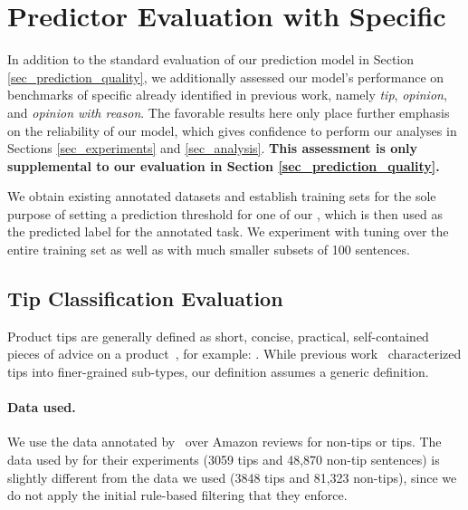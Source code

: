 % 




\section{Predictor Evaluation with Specific \taxtypes{}}
\label{sec_appendix_predictor_eval_type_specific}

In addition to the standard evaluation of our \taxtypes{} prediction model in Section \ref{sec_prediction_quality}, we additionally assessed our model's performance on benchmarks of specific \taxtypes{} already identified in previous work, namely \textit{tip}, \textit{opinion}, and \textit{opinion with reason}. The favorable results here only place further emphasis on the reliability of our model, which gives confidence to perform our analyses in Sections \ref{sec_experiments} and \ref{sec_analysis}. \textbf{This assessment is only supplemental to our evaluation in Section \ref{sec_prediction_quality}.}

We obtain existing annotated datasets and establish training sets for the sole purpose of setting a prediction threshold for one of our \taxtypes{}, which is then used as the predicted label for the annotated task.
We experiment with tuning over the entire training set as well as with much smaller subsets of 100 sentences.


\subsection{Tip Classification Evaluation}
\label{sec_appendix_experiments_tips}

Product tips are generally defined as short, concise, practical, self-contained pieces of advice on a product~\citep{hirsch2021producttips}, for example: . While previous work~\citep{hirsch2021producttips, farber2022tips} characterized tips into finer-grained sub-types, our definition assumes a generic definition.

\paragraph{Data used.}
We use the data annotated by~\citet{hirsch2021producttips} over Amazon reviews for non-tips or tips. The data used by \citet{hirsch2021producttips} for their experiments (3059 tips and 48,870 non-tip sentences) is slightly different from the data we used (3848 tips and 81,323 non-tips), since we do not apply the initial rule-based filtering that they enforce.

